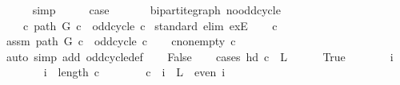 \begin{isabellebody}
\ \ \ \ \isamarkupfalse%
\ simp\isanewline
\ \ \isamarkupfalse%
\ \isamarkupfalse%
\ {\isacharquery}{\kern0pt}case\isanewline
\ \ \ \ \isacommand{{\isachardot}{\kern0pt}}\isamarkupfalse%
\isanewline
{}\isamarkupfalse%
%
\endisatagproof
{\isafoldproof}%
%
\isadelimproof
\isanewline
%
\endisadelimproof
\isanewline
{}\isamarkupfalse%
\ {\isacharparenleft}{\kern0pt}\ bipartite{\isacharunderscore}{\kern0pt}graph{\isacharparenright}{\kern0pt}\ no{\isacharunderscore}{\kern0pt}odd{\isacharunderscore}{\kern0pt}cycle{\isacharcolon}{\kern0pt}\isanewline
\ \ \ {\isachardoublequoteopen}{\isasymnot}\ {\isacharparenleft}{\kern0pt}{\isasymexists}c{\isachardot}{\kern0pt}\ path\ G\ c\ {\isasymand}\ odd{\isacharunderscore}{\kern0pt}cycle\ c{\isacharparenright}{\kern0pt}{\isachardoublequoteclose}\isanewline
%
\isadelimproof
%
\endisadelimproof
%
\isatagproof
{}\isamarkupfalse%
\ {\isacharparenleft}{\kern0pt}standard{\isacharcomma}{\kern0pt}\ elim\ exE{\isacharparenright}{\kern0pt}\isanewline
\ \ \isamarkupfalse%
\ c\isanewline
\ \ \isamarkupfalse%
\ assm{\isacharcolon}{\kern0pt}\ {\isachardoublequoteopen}path\ G\ c\ {\isasymand}\ odd{\isacharunderscore}{\kern0pt}cycle\ c{\isachardoublequoteclose}\isanewline
\ \ \isamarkupfalse%
\ c{\isacharunderscore}{\kern0pt}non{\isacharunderscore}{\kern0pt}empty{\isacharcolon}{\kern0pt}\ {\isachardoublequoteopen}c\ {\isasymnoteq}\ {\isacharbrackleft}{\kern0pt}{\isacharbrackright}{\kern0pt}{\isachardoublequoteclose}\isanewline
\ \ \ \ \isamarkupfalse%
\ {\isacharparenleft}{\kern0pt}auto\ simp\ add{\isacharcolon}{\kern0pt}\ odd{\isacharunderscore}{\kern0pt}cycle{\isacharunderscore}{\kern0pt}def{\isacharparenright}{\kern0pt}\isanewline
\ \ \isamarkupfalse%
\ False\isanewline
\ \ \isamarkupfalse%
\ {\isacharparenleft}{\kern0pt}cases\ {\isachardoublequoteopen}hd\ c\ {\isasymin}\ L{\isachardoublequoteclose}{\isacharparenright}{\kern0pt}\isanewline
\ \ \ \ \isamarkupfalse%
\ True\isanewline
\ \ \ \ \isacommand{{\isacharbraceleft}{\kern0pt}}\isamarkupfalse%
\ \isamarkupfalse%
\ i\isanewline
\ \ \ \ \ \ \isamarkupfalse%
\ {\isachardoublequoteopen}i\ {\isacharless}{\kern0pt}\ length\ c{\isachardoublequoteclose}\isanewline
\ \ \ \ \ \ \isamarkupfalse%
\ {\isachardoublequoteopen}c\ {\isacharbang}{\kern0pt}\ i\ {\isasymin}\ L\ {\isasymlongleftrightarrow}\ even\ i{\isachardoublequoteclose}\isanewline

\end{isabellebody}
